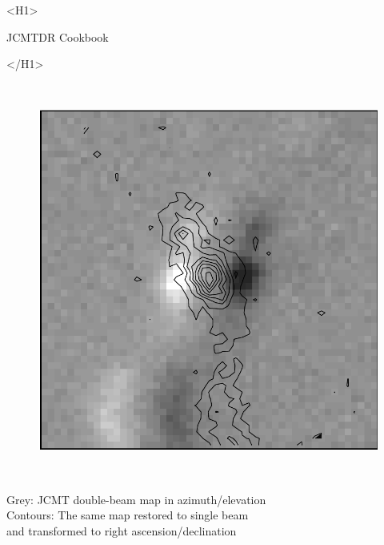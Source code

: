 \documentclass[11pt]{article}
\newcommand{\stardoctitle}     {JCMTDR Cookbook}
\newcommand{\xlabel}[1]{}
\begin{document}
\begin{htmlonly}
   \xlabel{}
   \begin{rawhtml} <H1> \end{rawhtml}
      \stardoctitle
   \begin{rawhtml} </H1> \end{rawhtml}

   \begin{figure}[h]
   \includegraphics[height=130mm]{sc1_cover}
   \end{figure}

   Grey: JCMT double-beam map in azimuth/elevation\\
   Contours: The same map restored to single beam\\
   and transformed to right ascension/declination


\end{htmlonly}
\end{document}
